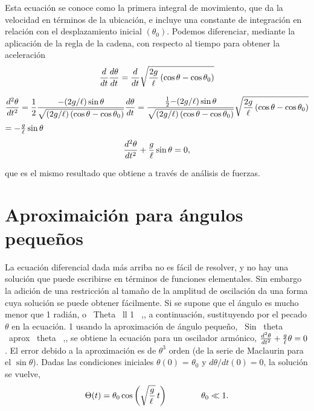 \documentclass[12pt]{article}
\begin{document}
Esta ecuación se conoce como la primera integral de movimiento, que da la velocidad en términos de la ubicación, e incluye una constante de integración en relación con el desplazamiento inicial $(\theta_0)$. Podemos diferenciar, mediante la aplicación de la regla de la cadena, con respecto al tiempo para obtener la aceleración
\begin{equation}
{d\over dt} {d\theta\over dt} ={d\over dt}\sqrt {{2g\over \ell} \left(\cos\theta-\cos\theta_0\right)}
\end{equation}

\begin{equation}
{d^2\theta \over dt^2} ={1 \over 2} {{-(2g/\ell) \sin\theta}\over{\sqrt {(2g/ \ell) \left(\cos \theta - \cos\theta_0 \right)}}} {d\theta\over dt} \\ ={{1 \over 2}{-(2g / \ell)\sin\theta}\over {\sqrt {(2g/ \ell) \left(\cos \theta-\cos\theta_0 \right)}}}
{\sqrt {{2g\over \ell} \left(\cos \theta- \cos \theta_0 \right)}}
\end{equation}
$=-{g \over \ell} \sin\theta$
\begin{equation}
{d^2\theta \over dt^2}+ {g\over \ell} \sin\theta = 0,
\end{equation}

que es el mismo resultado que obtiene a través de análisis de fuerzas.

\section{Aproximaición para ángulos pequeños}
La ecuación diferencial dada más arriba no es fácil de resolver, y no hay una solución que puede escribirse en términos de funciones elementales. Sin embargo la adición de una restricción al tamaño de la amplitud de oscilación da una forma cuya solución se puede obtener fácilmente. Si se supone que el ángulo es mucho menor que 1 radián, o
\ Theta \ ll 1 \ ,,
a continuación, sustituyendo por el pecado $\theta$ en la ecuación. 1 usando la aproximación de ángulo pequeño,
\ Sin \ theta \ aprox \ theta \ ,,
se obtiene la ecuación para un oscilador armónico,
${d^2 \theta \over dt^2} + {g\over\ell} \theta = 0$.
El error debido a la aproximación es de $\theta^3$ orden (de la serie de Maclaurin para el $\sin\theta$).
Dadas las condiciones iniciales $\theta\left(0\right)$ = $\theta_0$ y ${d\theta / dt} (0) = 0$, la solución se vuelve,
\begin{equation}
\Theta (t) = \theta_0 \cos \left(\sqrt {g \over \ell \,} \, t\right) \quad \quad \quad \quad \theta_0 \ll 1.
\end{equation}
\end{document}
